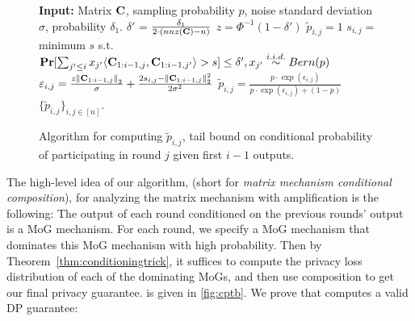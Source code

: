 \begin{figure}
\begin{algorithm}[H]
\caption{\texttt{ProbabilityTailBounds}($\bfC, p, \sigma, \delta_1)$}
\begin{algorithmic}[1]
\State \textbf{Input:} Matrix $\mathbf{C}$, sampling probability $p$, noise standard deviation $\sigma$, probability $\delta_1$.
\State $\delta'$ = $\frac{\delta_1}{2 \cdot (nnz(\mathbf{C}) - n)}$ 
\State $z = \Phi^{-1}(1 - \delta')$ 
\State $\tilde{p}_{i, j} = 1$
\Else 
\State $s_{i,j} = $ minimum $s$ s.t. $\mathop{\mathbf{Pr}}[\sum_{j' \leq i} x_{j'} \langle \mathbf{C}_{1:i-1,j}, \mathbf{C}_{1:i-1, j'} \rangle > s] \leq \delta', x_{j'} \stackrel{i.i.d.}{\sim} Bern(p)$\newline {}
\State $\varepsilon_{i, j} = \frac{z \left\|\mathbf{C}_{1:i-1, j}\right\|_2}{\sigma} + \frac{2s_{i,j}- \left\|\mathbf{C}_{1:i-1, j}\right\|_2^2}{2\sigma^2}$ \newline {}
\State $\tilde{p}_{i, j} = \frac{p \cdot \exp\left(\epsilon_{i, j}\right)}{p \cdot \exp\left(\epsilon_{i, j}\right) + (1-p)}$
\EndIf
\EndFor
\State \Return $\{\tilde{p}_{i,j}\}_{i, j \in [n]}$. 
\end{algorithmic}
\end{algorithm}
\caption{Algorithm for computing $\tilde{p}_{i,j}$, tail bound on conditional probability of participating in round $j$ given first $i-1$ outputs.}
\label{fig:cptb-subroutine}
\end{figure}

The high-level idea of our algorithm, \CPTB{} (short for \textit{matrix mechanism conditional composition}), for analyzing the matrix mechanism with amplification is the following: The output of each round conditioned on the previous rounds' output is a MoG mechanism. For each round, we specify a MoG mechanism that dominates this MoG mechanism with high probability. Then by Theorem~\ref{thm:conditioningtrick}, it suffices to compute the privacy loss distribution of each of the dominating MoGs, and then use composition to get our final privacy guarantee. \MMCC{} is given in \cref{fig:cptb}. We prove that \MMCC{} computes a valid DP guarantee:

